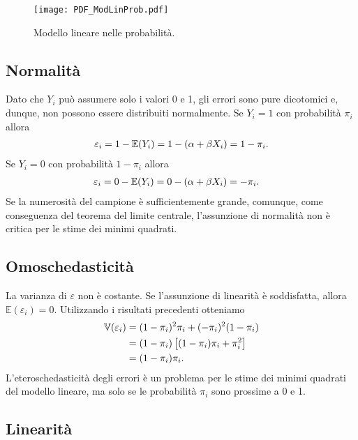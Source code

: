 \begin{figure}[h!]
  \begin{center}
    \texttt{[image: PDF\_ModLinProb.pdf]}
  \end{center}
\caption{Modello lineare nelle probabilità.}
\label{fig:lin_probmod}
\end{figure}

\subsection{Normalità}

Dato che $Y_i$ può assumere solo i valori 0 e 1, gli errori sono pure dicotomici e, dunque, non possono essere distribuiti normalmente. 
Se $Y_i=1$ con probabilità $\pi_i$ allora
\begin{align}
\varepsilon_i = 1- \mathbb{E}(Y_i) = 1- (\alpha + \beta X_i) = 1 - \pi_i. \notag 
\end{align}
Se $Y_i=0$ con probabilità $1-\pi_i$ allora
    \begin{align}
      \varepsilon_i &= 0- \mathbb{E}(Y_i) = 0- (\alpha + \beta X_i) =
      - \pi_i. \notag
    \end{align}
Se la numerosità del campione è sufficientemente grande, comunque, come conseguenza del teorema del limite centrale, l'assunzione di normalità non è critica per le stime dei minimi quadrati.

\subsection{Omoschedasticità}

La varianza di $\varepsilon$ non è costante. Se l'assunzione di linearità è soddisfatta, allora $\mathbb{E}(\varepsilon_i)=0$.
Utilizzando i risultati precedenti otteniamo
\begin{align}
      \mathbb{V}(\varepsilon_i) &=  (1- \pi_i)^2\pi_i + (-\pi_i)^2(1-\pi_i) \notag \\
      &= (1-\pi_i)\left[ (1-\pi_i) \pi_i + \pi_i^2 \right]\notag\\
      &= (1 - \pi_i)\pi_i. \notag
\end{align}
L'eteroschedasticità degli errori è un problema per le stime dei minimi quadrati del modello lineare, ma solo se le probabilità $\pi_i$ sono prossime a 0 e 1.
   
\subsection{Linearità}

